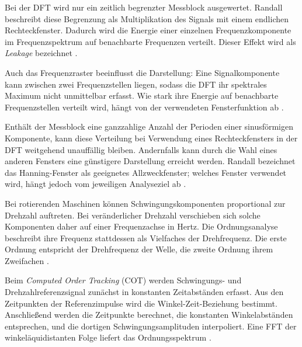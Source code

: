 \label{par:spektraldarstellung_fensterung}
Bei der DFT wird nur ein zeitlich begrenzter Messblock ausgewertet. Randall
beschreibt diese Begrenzung als Multiplikation des Signals mit einem endlichen
Rechteckfenster. Dadurch wird die Energie einer einzelnen Frequenzkomponente im
Frequenzspektrum auf benachbarte Frequenzen verteilt. Dieser Effekt wird als
\emph{Leakage} bezeichnet
\cite[S.~85--86, Abschn.~3.2.8.1, Abb.~3.19]
{randallVibrationbasedConditionMonitoring2022}.

Auch das Frequenzraster beeinflusst die Darstellung: Eine Signalkomponente
kann zwischen zwei Frequenzstellen liegen, sodass die DFT ihr spektrales
Maximum nicht unmittelbar erfasst. Wie stark ihre Energie auf benachbarte
Frequenzstellen verteilt wird, hängt von der verwendeten Fensterfunktion ab
\cite[S.~85--86, Abschn.~3.2.8.1, Abb.~3.19;
S.~87--88, Tab.~3.1 und Abschn.~3.2.8.2]
{randallVibrationbasedConditionMonitoring2022}.

Enthält der Messblock eine ganzzahlige Anzahl der Perioden einer sinusförmigen
Komponente, kann diese Verteilung bei Verwendung eines Rechteckfensters in der
DFT weitgehend unauffällig bleiben. Andernfalls kann durch die Wahl eines
anderen Fensters eine günstigere Darstellung erreicht werden. Randall bezeichnet
das Hanning-Fenster als geeignetes Allzweckfenster; welches Fenster verwendet
wird, hängt jedoch vom jeweiligen Analyseziel ab
\cite[S.~86--88, Abschn.~3.2.8.1--3.2.8.2, Abb.~3.21, Tab.~3.1]
{randallVibrationbasedConditionMonitoring2022}.


Bei rotierenden Maschinen können Schwingungskomponenten proportional zur
Drehzahl auftreten. Bei veränderlicher Drehzahl verschieben sich solche
Komponenten daher auf einer Frequenzachse in Hertz. Die Ordnungsanalyse
beschreibt ihre Frequenz stattdessen als Vielfaches der Drehfrequenz. Die erste
Ordnung entspricht der Drehfrequenz der Welle, die zweite Ordnung ihrem
Zweifachen
\cite[S.~187, Abstract und Abschn.~1]{fyfeANALYSISCOMPUTEDORDER1997}.

Beim \emph{Computed Order Tracking} (COT) werden Schwingungs- und
Drehzahlreferenzsignal zunächst in konstanten Zeitabständen erfasst. Aus den
Zeitpunkten der Referenzimpulse wird die Winkel-Zeit-Beziehung bestimmt.
Anschließend werden die Zeitpunkte berechnet, die konstanten Winkelabständen
entsprechen, und die dortigen Schwingungsamplituden interpoliert. Eine FFT der
winkeläquidistanten Folge liefert das Ordnungsspektrum
\cite[S.~188--191, Abschn.~1.2, Abb.~2--3, Gl.~(1)--(8)]
{fyfeANALYSISCOMPUTEDORDER1997}.

